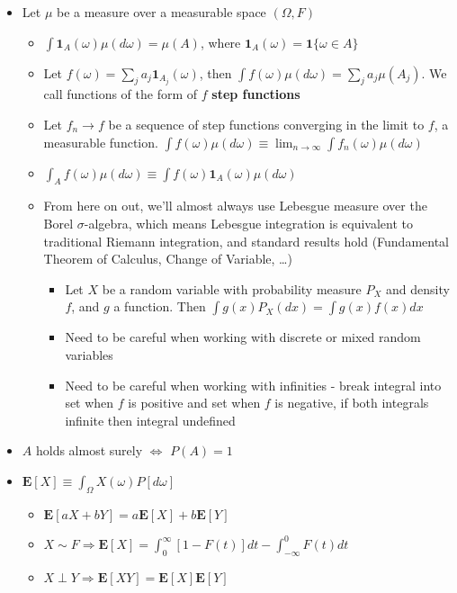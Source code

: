 \documentclass[12pt,english]{article}
\begin{document}
\begin{itemize}
	\item Let $\mu$ be a measure over a measurable space $(\Omega, F)$
	\begin{itemize}
		\item $\int \mathbf{1}_{A}(\omega) \mu(d\omega) = \mu(A)$, where $\mathbf{1}_{A}(\omega) = \mathbf{1} \{ \omega \in A \}$
		\item Let $f(\omega) = \sum_{j} a_{j} \mathbf{1}_{A_{j}}(\omega)$, then $\int f(\omega) \mu(d\omega) = \sum_{j} a_{j} \mu(A_{j})$. We call functions of the form of $f$ \textbf{step functions}
		\item Let $f_{n} \to f$ be a sequence of step functions converging in the limit to $f$, a measurable function. $\int f(\omega) \mu(d\omega) \equiv \lim_{n \to \infty} \int f_{n}(\omega) \mu(d\omega)$
		\item $\int_{A} f(\omega) \mu(d\omega) \equiv \int f(\omega) \mathbf{1}_{A}(\omega) \mu(d\omega)$
		\item From here on out, we'll almost always use Lebesgue measure over the Borel $\sigma$-algebra, which means Lebesgue integration is equivalent to traditional Riemann integration, and standard results hold (Fundamental Theorem of Calculus, Change of Variable, \ldots)
		\begin{itemize}
			\item Let $X$ be a random variable with probability measure $P_{X}$ and density $f$, and $g$ a function. Then $\int g(x) P_{X}(dx) = \int g(x) f(x) dx$
			\item Need to be careful when working with discrete or mixed random variables
			\item Need to be careful when working with infinities - break integral into set when $f$ is positive and set when $f$ is negative, if both integrals infinite then integral undefined
		\end{itemize}
	\end{itemize}
	\item $A$ holds almost surely $\Leftrightarrow$ $P(A) = 1$
	\item $\mathbf{E}[X] \equiv \int_{\Omega} X(\omega) P[d\omega]$
	\begin{itemize}
		\item $\mathbf{E}[aX + bY] = a\mathbf{E}[X] + b \mathbf{E}[Y]$
		\item $X \sim F \Rightarrow \mathbf{E}[X] = \int_{0}^{\infty} [1 - F(t)]dt - \int_{-\infty}^{0} F(t) dt$
		\item $X \perp Y \Rightarrow \mathbf{E}[XY] = \mathbf{E}[X] \mathbf{E}[Y]$

\end{itemize}
\end{itemize}
\end{document}
